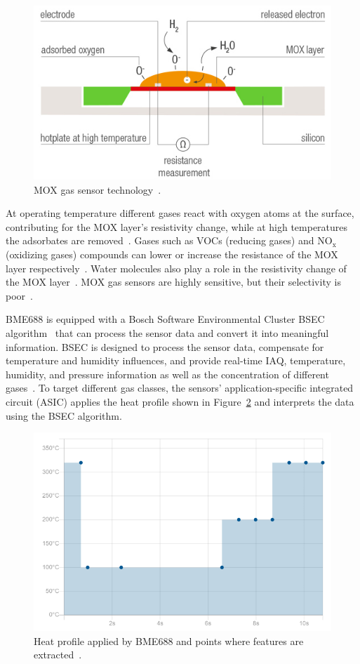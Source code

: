 \documentclass[DIV=14]{scrartcl}
\begin{document}
    \begin{figure}[!h]
        \centering
        \includegraphics[width=.8\textwidth]{figures/moxGasSensor.png}
        \caption{MOX gas sensor technology~\cite{Sensirion}.}
        \label{fig:moxGasSensor}
    \end{figure}

    At operating temperature different gases react with oxygen atoms at the surface, contributing for the MOX layer's
    resistivity change, while at high temperatures the adsorbates are removed~\cite{labManual}.
    Gases such as VOCs (reducing gases) and $\mathrm{NO_x}$ (oxidizing gases) compounds can lower or increase the
    resistance of the MOX layer respectively~\cite{labManual}.
    Water molecules also play a role in the resistivity change of the MOX layer~\cite{labManual}.
    MOX gas sensors are highly sensitive, but their selectivity is poor~\cite{labManual}.

    BME688 is equipped with a Bosch Software Environmental Cluster BSEC algorithm~\cite{BME688} that can process the sensor data and convert
    it into meaningful information.
    BSEC is designed to process the sensor data, compensate for temperature and humidity influences, and
    provide real-time IAQ, temperature, humidity, and pressure information as well as the concentration
    of different gases~\cite{BME688}.
    To target different gas classes, the sensors' application-specific integrated circuit (ASIC) applies the heat profile
    shown in Figure~\ref{fig:heatProfile} and interprets the data using the BSEC algorithm.

    \begin{figure}[!h]
        \centering
        \includegraphics[width=.8\textwidth]{figures/heatProfile}
        \caption{Heat profile applied by BME688 and points where features are extracted~\cite{BME688}.}
        \label{fig:heatProfile}
    \end{figure}
\end{document}
